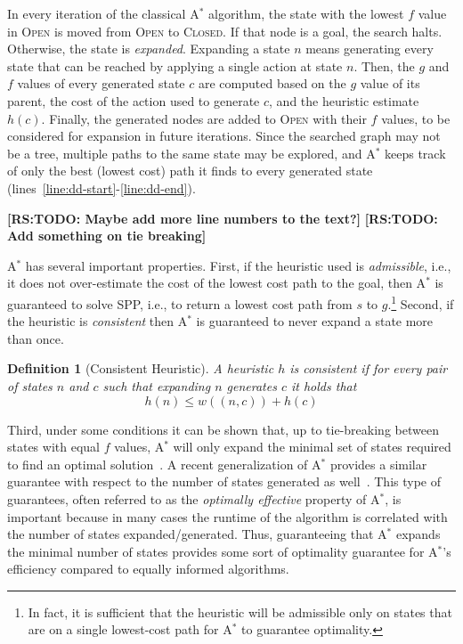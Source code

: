 \documentclass{aicom2e}
\newtheorem{definition}{Definition}
\newcommand{\astar}{A$^*$}
\newcommand{\open}{\textsc{Open}}
\newcommand{\closed}{\textsc{Closed}}
\newcommand{\roni}[1]{\textbf{[RS:#1]}}
\begin{document}
In every iteration of the classical \astar{} algorithm, the state with the lowest $f$ value in \open{} is moved from \open{} to \closed{}. 
If that node is a goal, the search halts. Otherwise, the state is {\em expanded}.  
Expanding a state $n$ means generating every state that can be reached by applying a single action at state $n$. 
Then, the $g$ and $f$ values of every generated state $c$ are computed based on the $g$ value of its parent, the cost of the action used to generate $c$, and the heuristic estimate $h(c)$. Finally, the generated nodes are added to \open{} with their $f$ values, to be considered for expansion in future iterations. Since the searched graph may not be a tree, multiple paths to the same state may be explored, and \astar{} keeps track of only the best (lowest cost) path it finds to every generated state (lines~\ref{line:dd-start}-\ref{line:dd-end}).  


\roni{TODO: Maybe add more line numbers to the text?}
\roni{TODO: Add something on tie breaking}

\astar{} has several important properties. First, if the heuristic used is {\em admissible}, i.e., it does not over-estimate the cost of the lowest cost path to the goal, then \astar{} is guaranteed to solve SPP, i.e., to return a lowest cost path from $s$ to $g$.\footnote{In fact, it is sufficient that the heuristic will be admissible only on states that are on a single lowest-cost path for \astar{} to guarantee optimality.} 
Second, if the heuristic is {\em consistent} then \astar{} is guaranteed to never expand a state more than once. 
\begin{definition}[Consistent Heuristic]
	A heuristic $h$ is consistent if for every pair of states $n$ and $c$ such that expanding $n$ generates $c$ 
	it holds that 
	\[ h(n)\leq w((n,c))+h(c) \]
	\label{def:consistent}
\end{definition}
Third, under some conditions it can be shown that, up to tie-breaking between states with equal $f$ values, \astar{} will only expand the minimal set of states required to find an optimal solution~\cite{dechter1985generalizedBestFirst}. 
A recent generalization of \astar{} provides a similar guarantee with respect to the number of states generated as well~\cite{Goldenberg}. This type of guarantees, often referred to as the {\em optimally effective} property of \astar{}, is  important because in many cases the runtime of the algorithm is correlated with the number of states expanded/generated. 
Thus, guaranteeing that \astar{} expands the minimal number of states provides some sort of optimality guarantee for \astar{}'s efficiency compared to equally informed algorithms. 
\end{document}
